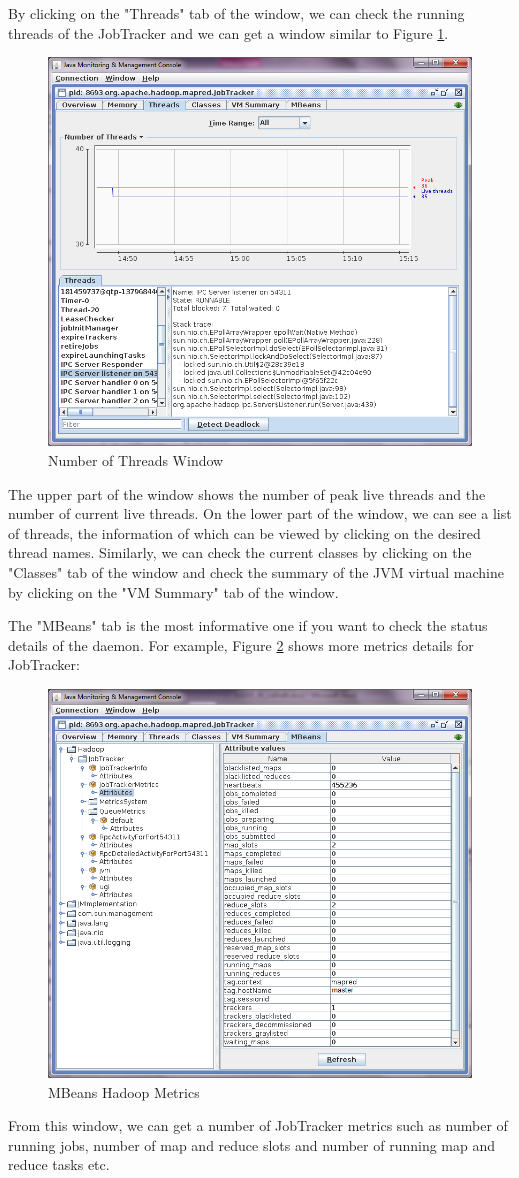 By clicking on the "Threads" tab of the window, we can check the running threads of the JobTracker and we can get a window similar to Figure \ref{fig:num.threads}.
\begin{figure}[ht]
  \centering
  \includegraphics[width=.7\textwidth]{figs/5163os_06_04.png}
  \caption{Number of Threads Window}\label{fig:num.threads}
\end{figure} 
The upper part of the window shows the number of peak live threads and the number of current live threads. On the lower part of the window, we can see a list of threads, the information of which can be viewed by clicking on the desired thread names.
Similarly, we can check the current classes by clicking on the "Classes" tab of the window and check the summary of the JVM virtual machine by clicking on the "VM Summary" tab of the window.

The "MBeans" tab is the most informative one if you want to check the status details of the daemon. For example, Figure \ref{fig:mbeans.hadoop.metrics} shows more metrics details for JobTracker:
\begin{figure}[ht]
  \centering
  \includegraphics[width=.7\textwidth]{figs/5163os_06_05.png}
  \caption{MBeans Hadoop Metrics}\label{fig:mbeans.hadoop.metrics}
\end{figure} 
From this window, we can get a number of JobTracker metrics such as number of running jobs, number of map and reduce slots and number of running map and reduce tasks etc.
